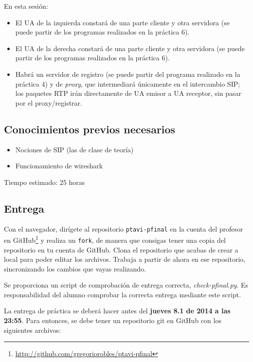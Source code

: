 \documentclass[a4paper,11pt]{article}
\begin{document}
En esta sesión:

\begin{itemize}
  \item El UA de la izquierda constará de una parte cliente y otra servidora (se puede partir de los programas realizados en la práctica 6).
  \item El UA de la derecha constará de una parte cliente y otra servidora (se puede partir de los programas realizados en la práctica 6).
  \item Habrá un servidor de registro (se puede partir del programa realizado en la práctica 4) y de \emph{proxy}, que intermediará únicamente en el intercambio SIP; los paquetes RTP irán directamente de UA emisor a UA receptor, sin pasar por el proxy/registrar.
\end{itemize}


\subsection{Conocimientos previos necesarios}

\begin{itemize}
  \item Nociones de SIP (las de clase de teoría)
  \item Funcionamiento de wireshark
\end{itemize}

Tiempo estimado: 25 horas


\subsection{Entrega}

Con el navegador, dirígete al repositorio \texttt{ptavi-pfinal} en la cuenta del profesor en GitHub\footnote{\url{http://github.com/gregoriorobles/ptavi-pfinal}} y realiza un \texttt{fork}, de manera que consigas tener una copia del repositorio en tu cuenta de GitHub. Clona el repositorio que acabas de crear a local para poder editar los archivos. Trabaja a partir de ahora en ese repositorio, sincronizando los cambios que vayas realizando.

Se proporciona un script de comprobación de entrega correcta, \emph{check-pfinal.py}. Es responsabilidad del alumno comprobar la correcta entrega mediante este script.

La entrega de práctica se deberá hacer antes del {\bf jueves 8.1 de 2014 a las 23:55}. Para entonces, se debe tener un repositorio git en GitHub con los siguientes archivos:
\end{document}
